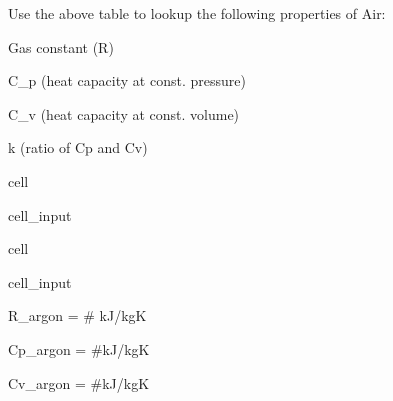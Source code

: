 \documentclass[letterpaper,10pt,english]{jupyterBook}
\begin{document}
\sphinxAtStartPar
Use the above table to look\sphinxhyphen{}up the following properties of Air:

\sphinxAtStartPar
Gas constant (R)

\sphinxAtStartPar
C\_p (heat capacity at const. pressure)

\sphinxAtStartPar
C\_v (heat capacity at const. volume)

\sphinxAtStartPar
k (ratio of Cp and Cv)

\begin{sphinxuseclass}{cell}\begin{sphinxVerbatimInput}

\begin{sphinxuseclass}{cell_input}
\begin{sphinxVerbatim}[commandchars=\\\{\}]
   
   
   
  
\end{sphinxVerbatim}

\end{sphinxuseclass}\end{sphinxVerbatimInput}

\end{sphinxuseclass}
\begin{sphinxuseclass}{cell}\begin{sphinxVerbatimInput}

\begin{sphinxuseclass}{cell_input}
\begin{sphinxVerbatim}[commandchars=\\\{\}]

\end{sphinxVerbatim}

\end{sphinxuseclass}\end{sphinxVerbatimInput}

\end{sphinxuseclass}
\sphinxAtStartPar
R\_argon = \# kJ/kgK

\sphinxAtStartPar
Cp\_argon = \#kJ/kgK

\sphinxAtStartPar
Cv\_argon =  \#kJ/kgK
\end{document}
